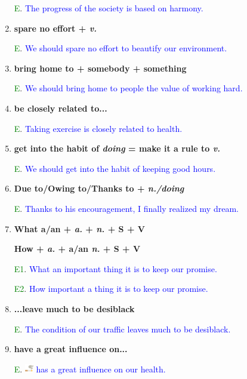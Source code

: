 \documentclass{article}
\begin{document}
\begin{enumerate}
  \textcolor{green}E. \textcolor{blue}{The progress of the society is based on harmony.}

\item \textbf{spare no effort + \emph{v.}}

  \textcolor{green}E. \textcolor{blue}{We should spare no effort to beautify our environment.}

\item \textbf{bring home to + somebody + something}

  \textcolor{green}E. \textcolor{blue}{We should bring home to people the value of working
  hard.}

\item \textbf{be closely related to...}

  \textcolor{green}E. \textcolor{blue}{Taking exercise is closely related to health.}

\item \textbf{get into the habit of \emph{doing} = make it a rule to \emph{v.}}

  \textcolor{green}E. \textcolor{blue}{We should get into the habit of keeping good hours.}

\item \textbf{Due to/Owing to/Thanks to + \emph{n./doing}}

  \textcolor{green}E. \textcolor{blue}{Thanks to his encouragement, I finally realized my dream.}

\item \textbf{What a/an + \emph{a.} + \emph{n.} + S + V}
  
    \textbf{How + \emph{a.} + a/an \emph{n.}  + S + V}

  \textcolor{green}{E1}. \textcolor{blue}{What an important thing it is to keep our
    promise.}

  \textcolor{green}{E2}. \textcolor{blue}{How important a thing it is to keep our promise.}

\item \textbf{...leave much to be desiblack}

  \textcolor{green}E. \textcolor{blue}{The condition of our traffic leaves much to be desiblack.}

\item \textbf{have a great influence on...}

  \textcolor{green}E. \includegraphics[height=1em]{smoking}\textcolor{blue}{ has a great
    influence on our health.}


\end{enumerate}
\end{document}
